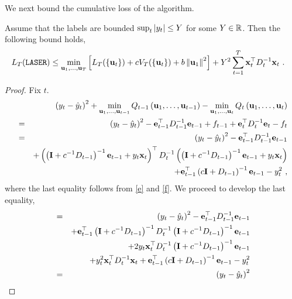 We next bound the cumulative loss of the algorithm.
\begin{theorem}
\label{thm:basic_bound}
Assume that the labels are bounded $\sup_t \vert y_{t} \vert \leq Y$ for some
$Y\in\mathbb{R}$. Then the following bound holds,
\begin{align}
L_T(\texttt{LASER})&\leq\min_{\vui{1},\ldots,\vui{T}}\left[
L_T(\{\vui{t}\})
+c V_T(\{\vui{t}\})%
+b\left\Vert
    \vui{1}\right\Vert ^{2}
\right]+Y^{2}\sum_{t=1}^{T}\vxti{t}D_{t}^{-1}\vxi{t} ~.\label{bound_1}
\end{align}
\end{theorem}
\begin{proof}
Fix $t$.
\begin{eqnarray*}
 &  & \left(y_{t}-\hat{y}_{t}\right)^{2}+\min_{\vui{1},\ldots,\vui{t-1}}Q_{t-1}\left(\vui{1},\ldots,\vui{t-1}\right)-\min_{\vui{1},\ldots,\vui{t}}Q_{t}\left(\vui{1},\ldots,\vui{t}\right)\\
 &=  & \left(y_{t}-\hat{y}_{t}\right)^{2}-\veti{t-1}D_{t-1}^{-1}\vei{t-1}+f_{t-1}+\veti{t}D_{t}^{-1}\vei{t}-f_{t}\\
 & = & \left(y_{t}-\hat{y}_{t}\right)^{2}-\veti{t-1}D_{t-1}^{-1}\vei{t-1}\\
 &  &
 +\left(\left(\mi+c^{-1}D_{t-1}\right)^{-1}\vei{t-1}+y_{t}\vxi{t}\right)^{\top}D_{t}^{-1}\left(\left(\mi+c^{-1}D_{t-1}\right)^{-1}\vphantom{\left(\mi+c^{-1}D_{t-1}\right)^{-1}}\vei{t-1}+y_{t}\vxi{t}\right)\\
&&
+\veti{t-1}\left(c\mi+D_{t-1}\right)^{-1}\vei{t-1}-y_{t}^{2} ~,
\end{eqnarray*}
where the last equality follows from \eqref{e} and \eqref{f}. We proceed to develop the
last equality,
\begin{eqnarray*}
&=  & \left(y_{t}-\hat{y}_{t}\right)^{2}-\veti{t-1}D_{t-1}^{-1}\vei{t-1}\\
 &  & +\veti{t-1}\left(\mi+c^{-1}D_{t-1}\right)^{-1}D_{t}^{-1}\left
 (\mi+c^{-1}D_{t-1}\right)^{-1}\vei{t-1}\\
 &  & +2y_{t}\vxti{t}D_{t}^{-1}
 \left(\mi+c^{-1}D_{t-1}\right)^{-1}\vei{t-1}\\
 &  &     +y_{t}^{2}\vxti{t}D_{t}^{-1}\vxi{t}
  +\veti{t-1}\left(c\mi+D_{t-1}\right)^{-1}\vei{t-1}-y_{t}^{2}\\
 & = & \left(y_{t}-\hat{y}_{t}\right)^{2}

\end{eqnarray*}
\end{proof}
